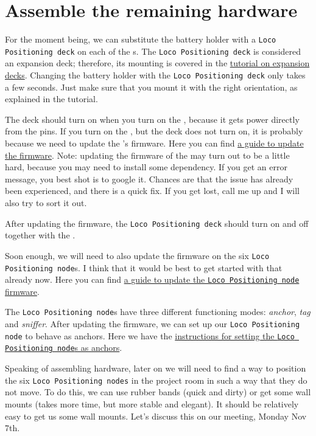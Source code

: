 \section*{Assemble the remaining hardware}

For the moment being, we can substitute the battery holder with a \texttt{Loco Positioning deck} on each of the \CF{}s.
The \texttt{Loco Positioning deck} is considered an expansion deck; therefore, its mounting is covered in the \href{https://www.bitcraze.io/getting-started-with-expansion-decks/}{tutorial on expansion decks}.
Changing the battery holder with the \texttt{Loco Positioning deck} only takes a few seconds.
Just make sure that you mount it with the right orientation, as explained in the tutorial.

The deck should turn on when you turn on the \CF{}, because it gets power directly from the pins.
If you turn on the \CF{}, but the deck does not turn on, it is probably because we need to update the \CF{}'s firmware.
Here you can find \href{https://github.com/bitcraze/crazyflie-firmware}{a guide to update the \CF{} firmware}.
Note: updating the firmware of the \CF{} may turn out to be a little hard, because you may need to install some dependency.
If you get an error message, you best shot is to google it.
Chances are that the issue has already been experienced, and there is a quick fix.
If you get lost, call me up and I will also try to sort it out.

After updating the firmware, the \texttt{Loco Positioning deck} should turn on and off together with the \CF{}.

Soon enough, we will need to also update the firmware on the six \texttt{Loco Positioning node}s.
I think that it would be best to get started with that already now.
Here you can find \href{https://github.com/bitcraze/lps-node-firmware}{a guide to update the \texttt{Loco Positioning node} firmware}.

The \texttt{Loco Positioning node}s have three different functioning modes: \emph{anchor}, \emph{tag} and \emph{sniffer}.
After updating the firmware, we can set up our \texttt{Loco Positioning node} to behave as anchors.
Here we have the \href{https://wiki.bitcraze.io/projects:lps:node#configuring_the_node}{instructions for setting the \texttt{Loco Positioning node}s as anchors}.

Speaking of assembling hardware, later on we will need to find a way to position the six \texttt{Loco Positioning nodes} in the project room in such a way that they do not move.
To do this, we can use rubber bands (quick and dirty) or get some wall mounts (takes more time, but more stable and elegant).
It should be relatively easy to get us some wall mounts.
Let's discuss this on our meeting, Monday Nov 7th.










